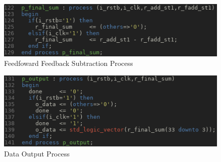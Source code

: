 \documentclass[12pt,a4paper,titlepage]{article}
\begin{document}
\begin{figure}[!htb]
  \centering
  \includegraphics[width=\textwidth]
                  {../presentation/final-add.png}
                  \caption{Feedfoward Feedback Subtraction Process}
                  \label{fig:a4}
\end{figure}
\begin{figure}[!htb]
  \centering
  \includegraphics[width=\textwidth]
                  {../presentation/output.png}
                  \caption{Data Output Process}
                  \label{fig:a5}
\end{figure}


\newpage
\end{document}
